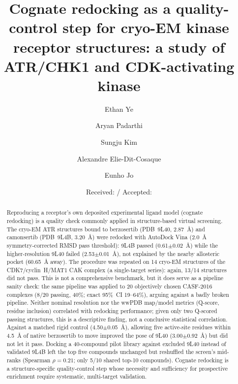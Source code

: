 \documentclass[global,twocolumn]{svjour}
\begin{document}
\title{Cognate redocking as a quality-control step for cryo-EM kinase
       receptor structures: a study of ATR/CHK1 and
       CDK-activating kinase}

\author{Ethan Ye \and Aryan Padarthi \and Sungju Kim \and Alexandre Elie-Dit-Cosaque \and Eunho Jo}

\date{Received: / Accepted:}
\maketitle

\begin{abstract}
Reproducing a receptor's own deposited experimental ligand model (cognate
redocking) is a quality check commonly applied in structure-based virtual
screening. The cryo-EM ATR structures bound to berzosertib (PDB~9L40,
2.87~\AA{}) and camonsertib (PDB~9L4B, 3.20~\AA{}) were redocked with
AutoDock Vina (2.0~\AA{} symmetry-corrected RMSD pass threshold): 9L4B
passed (0.61$\pm$0.02~\AA{}) while the higher-resolution 9L40 failed
(2.53$\pm$0.01~\AA{}), not explained by the nearby allosteric pocket
(60.65~\AA{} away). The procedure was repeated on 14 cryo-EM structures of
the CDK7/cyclin~H/MAT1 CAK complex (a single-target series): again, 13/14
structures did not pass. This is not a comprehensive benchmark, but it does
serve as a pipeline sanity check: the same pipeline was applied to 20
objectively chosen CASF-2016 complexes (8/20 passing, 40\%; exact 95\%~CI
19--64\%), arguing against a badly broken pipeline. Neither nominal
resolution nor the wwPDB map/model metrics (Q-score, residue inclusion)
correlated with redocking performance; given only two Q-scored passing
structures, this is a descriptive finding, not a conclusive statistical
correlation. Against a matched rigid control (4.50$\pm$0.05~\AA{}),
allowing five active-site residues within 4.5~\AA{} of native berzosertib
to move improved the pose of 9L40 (3.00$\pm$0.92~\AA{}) but did not let it
pass. Docking a 40-compound pilot library against excluded 9L40 instead of
validated 9L4B left the top five compounds unchanged but reshuffled the
screen's mid-ranks (Spearman $\rho=0.21$; only 5/10 shared top-10
compounds). Cognate redocking is a structure-specific quality-control step
whose necessity and sufficiency for prospective enrichment require
systematic, multi-target validation.
\end{abstract}
\end{document}
